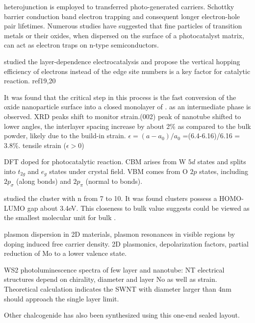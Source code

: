 heterojunction is employed to transferred photo-generated carriers. Schottky barrier conduction band electron trapping and consequent longer electron-hole pair lifetimes. Numerous studies have suggested that fine particles of transition metals or their oxides, when dispersed on the surface of a photocatalyst matrix, can act as electron traps on n-type semiconductors.\cite{Zhou2010} 

\citeauthor{Cao2014} studied the layer-dependence  electrocatalysis and propose the vertical hopping efficiency of electrons instead of the edge site numbers is a key factor for catalytic reaction.\cite{Cao2014} ref19,20

It was found that the critical step in this process is the fast conversion of the oxide nanoparticle surface into a closed monolayer of .  as an intermediate phase is observed. XRD peaks shift to monitor strain.(002) peak of nanotube shifted to lower angles, the interlayer spacing increase by about 2\% as compared to the bulk powder, likely due to the build-in strain.\cite{ZAK2009} 
$\epsilon = (a - a_0)/a_0$ =(6.4-6.16)/6.16 = 3.8\%. tensile strain ($\epsilon > 0$)


DFT doped  for photocatalytic reaction.\cite{Wang2012} CBM arises from W $5d$ states and splits into $t_{2g}$ and $e_g$ states under crystal field. VBM comes from O $2p$ states, including $2p_\sigma$ (along  bonds) and $2p_\pi$ (normal to  bonds).



\citeauthor{Huang2006} studied the  cluster with n from 7 to 10.\cite{Huang2006} It was found  clusters possess a HOMO-LUMO gap about 3.4eV. This closeness to bulk value suggests  could be viewed as the smallest molecular unit for bulk .

plasmon dispersion in 2D materials, plasmon resonances in visible regions by doping induced free carrier density. 2D plasmonics, depolarization factors, partial reduction of Mo to a lower valence state. \cite{Alsaif2014a}

WS2 photoluminescence spectra of few layer and nanotube:
NT electrical structures depend on chirality, diameter and layer No as well as strain. Theoretical calculation indicates the SWNT with diameter larger than 4nm should approach the single layer limit.\cite{Ghorbani-Asl2013}

Other chalcogenide has also been synthesized using this one-end sealed layout.\cite{Mukherjee2013}

